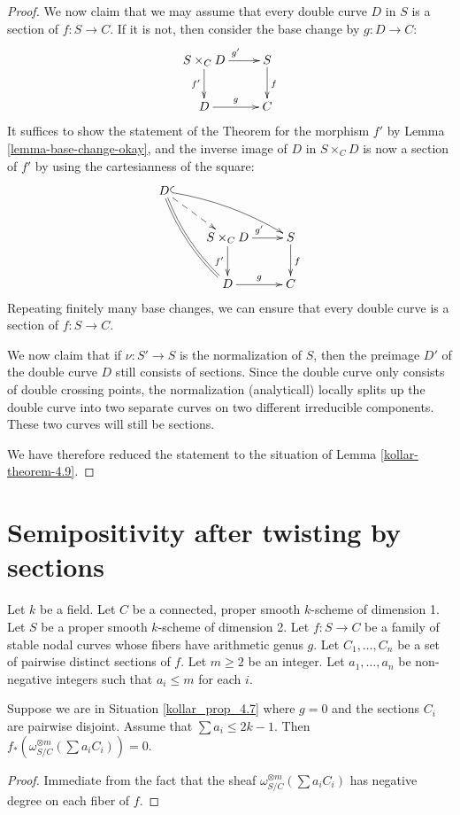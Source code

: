\begin{proof}
We now claim that we may assume that every double curve $D$ in $S$ is a
section of $f : S \to C$.
If it is not, then consider the base change by $g : D \to C$:
$$
\xymatrix{
S \times_C D \ar[r]^{g'}\ar[d]_{f'} & S \ar[d]^f\\
D \ar[r]^g & C
}
$$
It suffices to show the statement of the Theorem for the morphism $f'$ by Lemma
\ref{lemma-base-change-okay}, and the inverse image of $D$ in $S \times_C D$ is
now a section of $f'$ by using the cartesianness of the square:
$$
\xymatrix{
D\ar@{=}@/_/[ddr]\ar@{^{(}->}@/^/[drr]\ar@{-->}[dr]\\
& S \times_C D \ar[r]^{g'}\ar[d]_{f'} & S \ar[d]^f\\
& D \ar[r]^g & C
}
$$
Repeating finitely many base changes, we can ensure that every double curve is a
section of $f : S \to C$.

We now claim that if $\nu : S' \to S$ is the normalization of $S$, then the
preimage $D'$ of the double curve $D$ still consists of sections.
Since the double curve only consists of double crossing points, the
normalization (analyticall) locally splits up the double curve into two separate
curves on two different irreducible components.
These two curves will still be sections.

We have therefore reduced the statement to the situation of Lemma
\ref{kollar-theorem-4.9}.
\end{proof}

\section{Semipositivity after twisting by sections}

\begin{situation}\label{kollar_prop_4.7}
Let $k$ be a field.
Let $C$ be a connected, proper smooth $k$-scheme of dimension 1.
Let $S$ be a proper smooth $k$-scheme of dimension 2.
Let $f:S\to C$ be a family of stable nodal curves whose fibers have arithmetic genus $g$.
Let $C_1,\ldots,C_n$ be a set of pairwise distinct sections of $f$.
Let $m\ge2$ be an integer.
Let $a_1,\ldots,a_n$ be non-negative integers such that $a_i\le m$ for each $i$.
\end{situation}

\begin{lemma}\label{base_case_genus_0}
Suppose we are in Situation \ref{kollar_prop_4.7} where $g=0$ and the sections $C_i$ are pairwise disjoint.
Assume that $\sum a_i\le 2k-1$.
Then $f_{*}(\omega_{S/C}^{\otimes m}(\sum a_iC_i))=0$.
\end{lemma}
\begin{proof}
Immediate from the fact that the sheaf $\omega_{S/C}^{\otimes m}(\sum a_iC_i)$ has negative degree on each fiber of $f$.
\end{proof}

